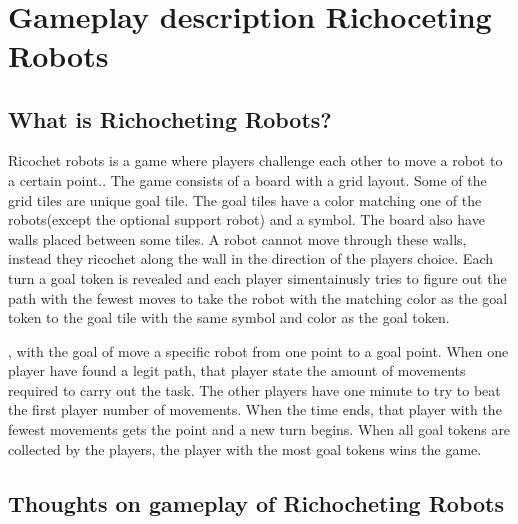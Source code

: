 \documentclass[a4paper]{article}
\begin{document}
\
\section{Gameplay description Richoceting Robots}
\subsection{What is Richocheting Robots?}
Ricochet robots is a game where players challenge each other to move a robot to a certain point.. The game consists of a board with a grid layout. Some of the grid tiles are unique goal tile. The goal tiles have a color matching one of the robots(except the optional support robot) and a symbol. The board also have walls placed between some tiles. A robot cannot move through these walls, instead they ricochet along the wall in the direction of the players choice. Each turn a goal token is revealed and each player simentainusly tries to figure out the path with the fewest moves to take the robot with the matching color as the goal token to the goal tile with the same symbol and color as the goal token. 

, with the goal of move a specific robot from one point to a goal point. When one player have found a legit path, that player state the amount of movements required to carry out the task. The other players have one minute to try to beat the first player number of movements. When the time ends, that player with the fewest movements gets the point and a new turn begins. When all goal tokens are collected by the players, the player with the most goal tokens wins the game.

\subsection{Thoughts on gameplay of Richocheting Robots}
\end{document}
